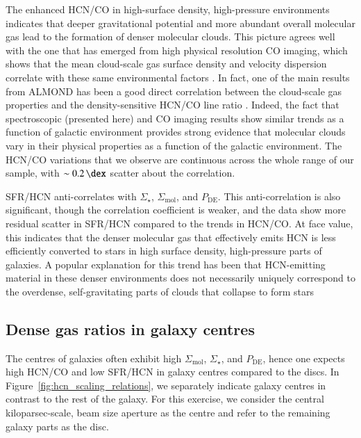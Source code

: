 \documentclass[letter, longauth]{aa} %
\newcommand*{\sigmol}{\ensuremath{\Sigma_{\text{mol}}}\xspace}  %
\newcommand*{\pde}{\ensuremath{P_{\text{DE}}}\xspace}  %
\newcommand*{\sigstar}{\ensuremath{\Sigma_{\star}}\xspace}  %
\begin{document}
The enhanced HCN/CO in high-surface density, high-pressure environments indicates that deeper gravitational potential and more abundant overall molecular gas lead to the formation of denser molecular clouds. 
This picture agrees well with the one that has emerged from high physical resolution CO imaging, which shows that the mean cloud-scale gas surface density and velocity dispersion correlate with these same environmental factors \citep[][]{Sun2022}. 
In fact, one of the main results from ALMOND has been a good direct correlation between the cloud-scale gas properties and the density-sensitive HCN/CO line ratio \citep{Neumann2023a}. 
Indeed, the fact that spectroscopic (presented here) and CO imaging results show similar trends as a function of galactic environment provides strong evidence that molecular clouds vary in their physical properties as a function of the galactic environment. 
The HCN/CO variations that we observe are continuous across the whole range of our sample, with $\sim\SI{0.2}{\dex}$ scatter about the correlation.

SFR/HCN anti-correlates with \sigstar, \sigmol, and \pde. 
This anti-correlation is also significant, though the correlation coefficient is weaker, and the data show more residual scatter in SFR/HCN compared to the trends in HCN/CO. 
At face value, this indicates that the denser molecular gas that effectively emits HCN is less efficiently converted to stars in high surface density, high-pressure parts of galaxies. 
A popular explanation for this trend has been that HCN-emitting material in these denser environments does not necessarily uniquely correspond to the overdense, self-gravitating parts of clouds that collapse to form stars \citep[e.g.][]{Krumholz2007, Shetty2014, Gallagher2018b, Neumann2023a, Bemis2023, Bemis2024}

\subsection{Dense gas ratios in galaxy centres}
\label{sec:centres}

The centres of galaxies often exhibit high \sigmol, \sigstar, and \pde, hence one expects high HCN/CO and low SFR/HCN in galaxy centres compared to the discs. 
In Figure~\ref{fig:hcn_scaling_relations}, we separately indicate galaxy centres in contrast to the rest of the galaxy.
For this exercise, we consider the central kiloparsec-scale, beam size aperture as the centre and refer to the remaining galaxy parts as the disc.
\end{document}
